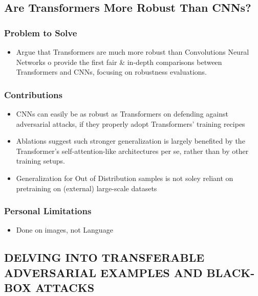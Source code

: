 \documentclass{article}
\begin{document}
\begin{flushleft}


 
 \subsection{Are Transformers More Robust Than CNNs?\cite{}} 
\subsubsection*{Problem to Solve}
\begin{itemize}
    \item Argue that Transformers are much more robust than Convolutions Neural Networks o provide the first fair & in-depth comparisons between Transformers and CNNs, focusing on robustness evaluations.
\end{itemize}

\subsubsection*{Contributions}
\begin{itemize}
 \item CNNs can easily be as robust as Transformers on defending against adversarial attacks, if they properly adopt Transformers’ training recipes
 \item Ablations suggest such stronger generalization is largely benefited by the Transformer’s self-attention-like architectures per se, rather than by other training setups.
 \item Generalization for Out of Distribution samples is not soley reliant on pretraining on (external) large-scale datasets
\end{itemize}

\subsubsection*{Personal Limitations}
\begin{itemize}
    \item Done on images, not Language 
\end{itemize}




 
 
\subsection{DELVING INTO TRANSFERABLE ADVERSARIAL EXAMPLES AND BLACK-BOX ATTACKS \cite{}} 

\end{flushleft}
\end{document}
